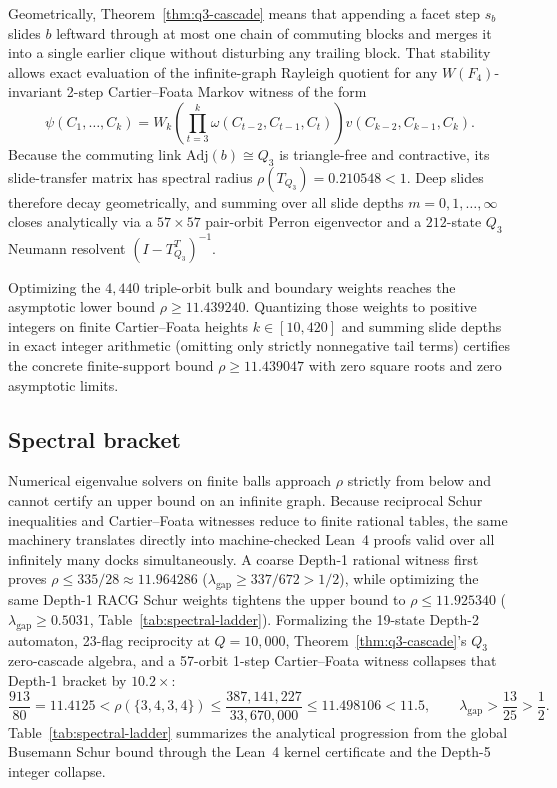 Geometrically, Theorem~\ref{thm:q3-cascade} means that appending a facet step $s_b$ slides $b$ leftward through at most
one chain of commuting blocks and merges it into a single earlier clique without disturbing any trailing block. That
stability allows exact evaluation of the infinite-graph Rayleigh quotient for any $W(F_4)$-invariant 2-step
Cartier--Foata Markov witness of the form
\begin{equation}
\psi(C_1, \dots, C_k)
= W_k \left(\prod_{t=3}^{k} \omega(C_{t-2}, C_{t-1}, C_t)\right) v(C_{k-2}, C_{k-1}, C_k).
\label{eq:cf-markov-witness}
\end{equation}
Because the commuting link $\mathrm{Adj}(b) \cong Q_3$ is triangle-free and contractive, its slide-transfer matrix has
spectral radius $\rho(T_{Q_3}) = 0.210548 < 1$. Deep slides therefore decay geometrically, and summing over all slide
depths $m = 0, 1, \dots, \infty$ closes analytically via a $57 \times 57$ pair-orbit Perron eigenvector and a
$212$-state $Q_3$ Neumann resolvent $(I - T_{Q_3}^T)^{-1}$.

Optimizing the $4{,}440$ triple-orbit bulk and boundary weights reaches the asymptotic lower bound $\rho \ge 11.439240$.
Quantizing those weights to positive integers on finite Cartier--Foata heights $k \in [10, 420]$ and summing slide
depths in exact integer arithmetic (omitting only strictly nonnegative tail terms) certifies the concrete
finite-support bound $\rho \ge 11.439047$ with zero square roots and zero asymptotic limits.

\subsection{Spectral bracket}

Numerical eigenvalue solvers on finite balls approach $\rho$ strictly from below and cannot certify an upper bound on an
infinite graph. Because reciprocal Schur inequalities and Cartier--Foata witnesses reduce to finite rational tables, the
same machinery translates directly into machine-checked Lean~4 proofs valid over all infinitely many docks
simultaneously. A coarse Depth-1 rational witness first proves $\rho \le 335/28 \approx 11.964286$
($\lambda_{\mathrm{gap}} \ge 337/672 > 1/2$), while optimizing the same Depth-1 RACG Schur weights tightens the upper
bound to $\rho \le 11.925340$ ($\lambda_{\mathrm{gap}} \ge 0.5031$, Table~\ref{tab:spectral-ladder}). Formalizing the
19-state Depth-2 automaton, 23-flag reciprocity at $Q = 10{,}000$, Theorem~\ref{thm:q3-cascade}'s $Q_3$ zero-cascade
algebra, and a 57-orbit 1-step Cartier--Foata witness collapses that Depth-1 bracket by $10.2\times$:
\begin{equation}
\frac{913}{80} = 11.4125 < \rho(\{3,4,3,4\}) \le \frac{387{,}141{,}227}{33{,}670{,}000} \le 11.498106 < 11.5,
\qquad
\lambda_{\mathrm{gap}} > \frac{13}{25} > \frac{1}{2}.
\label{eq:lean-spectral-bracket}
\end{equation}
Table~\ref{tab:spectral-ladder} summarizes the analytical progression from the global Busemann Schur bound through the
Lean~4 kernel certificate and the Depth-5 integer collapse.

